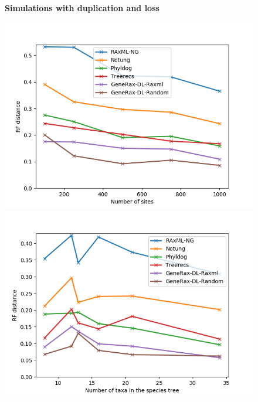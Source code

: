 \documentclass[12pt,a4paper]{article}
\begin{document}
\newcommand*{\figuretitle}[1]{%
    {\centering%
    \textbf{#1}%
    \par\medskip}%
}

\begin{figure}
\figuretitle{Simulations with duplication and loss}
\includegraphics[scale=0.5]{sites.png}
\includegraphics[scale=0.5]{species.png}

\end{figure}
\end{document}
